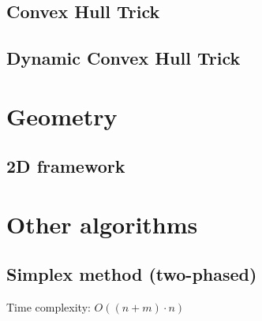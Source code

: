 \documentclass[10pt]{article}
\begin{document}
\subsection{Convex Hull Trick}

\subsection{Dynamic Convex Hull Trick}


\section{Geometry}
\subsection{2D framework}


\section{Other algorithms}
\subsection{Simplex method (two-phased)}
Time complexity: $O((n + m) \cdot n)$

\end{document}
